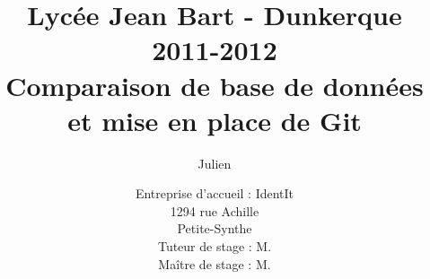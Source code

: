 \documentclass[12pt,a4paper]{report}
\title
{
	\normalsize{Lycée Jean Bart - Dunkerque\\
	2011-2012}\\
	\vspace{15mm}
	\Huge{Comparaison de base de données\\
    et mise en place de Git\\
    \vspace{15mm}}
}
\author{\bsc{Stechele} Julien\\
	\vspace{45mm}
}
\date{
	\normalsize{Entreprise d'accueil : IdentIt\\
    1294 rue Achille \bsc{Pérès}\\
	Petite-Synthe\\
	\vspace{5mm}
    Tuteur de stage : M.\bsc{Anselin}\\
	Maître de stage : M.\bsc{Dubourg}
	}
}%
\begin{document}
\maketitle



\renewcommand{\contentsname}{Sommaire}

{\setlength{\baselineskip}{1.4\baselineskip}
\tableofcontents\par}








\end{document}
